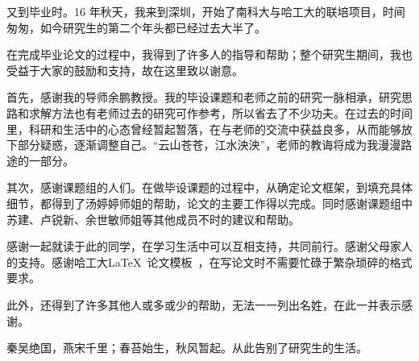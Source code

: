 \begin{acknowledgements}

又到毕业时。16 年秋天，我来到深圳，开始了南科大与哈工大的联培项目，时间匆匆，如今研究生的第二个年头都已经过去大半了。

在完成毕业论文的过程中，我得到了许多人的指导和帮助；整个研究生期间，我也受益于大家的鼓励和支持，故在这里致以谢意。

首先，感谢我的导师余鹏教授。我的毕设课题和老师之前的研究一脉相承，研究思路和求解方法也有老师过去的研究可作参考，所以省去了不少功夫。在过去的时间里，科研和生活中的心态曾经暂起暂落，在与老师的交流中获益良多，从而能够放下部分疑惑，逐渐调整自己。“云山苍苍，江水泱泱”，老师的教诲将成为我漫漫路途的一部分。

其次，感谢课题组的人们。在做毕设课题的过程中，从确定论文框架，到填充具体细节，都得到了汤婷婷师姐的帮助，论文的主要工作得以完成。同时感谢课题组中苏建、卢锐新、余世敏师姐等其他成员不时的建议和帮助。

感谢一起就读于此的同学，在学习生活中可以互相支持，共同前行。感谢父母家人的支持。感谢哈工大\LaTeX\ 论文模板\hithesis\ ，在写论文时不需要忙碌于繁杂琐碎的格式要求。

此外，还得到了许多其他人或多或少的帮助，无法一一列出名姓，在此一并表示感谢。


秦吴绝国，燕宋千里；春苔始生，秋风暂起。从此告别了研究生的生活。

\end{acknowledgements}
